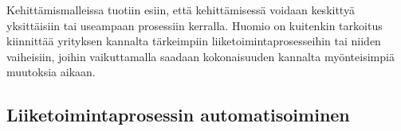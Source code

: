 \documentclass[finnish,12pt,a4paper,pdftex]{article}
\begin{document}
\noindent Kehittämismalleissa tuotiin esiin, että kehittämisessä voidaan keskittyä yksittäisiin tai useampaan prosessiin kerralla. Huomio on kuitenkin tarkoitus kiinnittää yrityksen kannalta tärkeimpiin liiketoimintaprosesseihin tai niiden vaiheisiin, joihin vaikuttamalla saadaan kokonaisuuden kannalta myönteisimpiä muutoksia aikaan.\\







\subsection{Liiketoimintaprosessin automatisoiminen}
\end{document}
